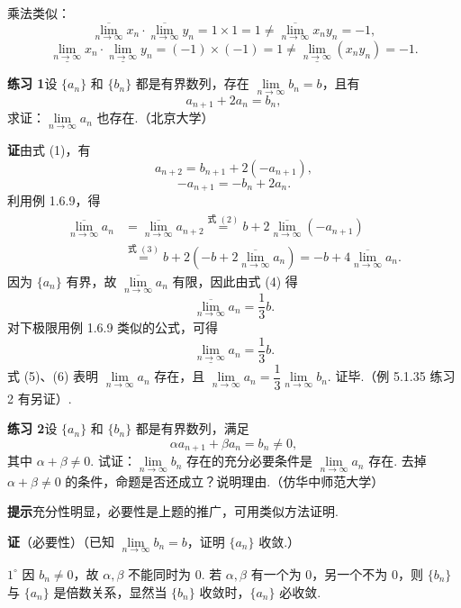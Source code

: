 \documentclass[UTF8, 12pt, fontset=fandol, oneside]{ctexart}
\begin{document}
乘法类似：
\[
  \overline{\lim_{n\to\infty}}x_n\cdot\overline{\lim_{n\to\infty}}y_n=1\times1=1
  \ne \overline{\lim_{n\to\infty}}x_ny_n=-1,
\]
\[
  \underline{\lim_{n\to\infty}}x_n\cdot\underline{\lim_{n\to\infty}}y_n=(-1)\times(-1)=1
  \ne \underline{\lim_{n\to\infty}}(x_ny_n)=-1.
\]

\noindent\textbf{练习 1}\quad 设 $\{a_n\}$ 和 $\{b_n\}$ 都是有界数列，存在 $\lim\limits_{n\to\infty}b_n=b$，且有
\[
  a_{n+1}+2a_n=b_n,
\tag{1}
\]
求证：$\lim\limits_{n\to\infty}a_n$ 也存在.（北京大学）

\noindent\textbf{证}\quad 由式 (1)，有
\[
  a_{n+2}=b_{n+1}+2(-a_{n+1}),
\tag{2}
\]
\[
  -a_{n+1}=-b_n+2a_n.
\tag{3}
\]
利用例 1.6.9，得
\[
\begin{aligned}
  \overline{\lim_{n\to\infty}}a_n
  &=\overline{\lim_{n\to\infty}}a_{n+2}
   \overset{\text{式 }(2)}{=} b+2\overline{\lim_{n\to\infty}}(-a_{n+1})\\
  &\overset{\text{式 }(3)}{=} b+2\left(-b+2\overline{\lim_{n\to\infty}}a_n\right)
   =-b+4\overline{\lim_{n\to\infty}}a_n.
\end{aligned}
\tag{4}
\]
因为 $\{a_n\}$ 有界，故 $\overline{\lim\limits_{n\to\infty}}a_n$ 有限，因此由式 (4) 得
\[
  \overline{\lim_{n\to\infty}}a_n=\frac13 b.
\tag{5}
\]
对下极限用例 1.6.9 类似的公式，可得
\[
  \underline{\lim_{n\to\infty}}a_n=\frac13 b.
\tag{6}
\]
式 (5)、(6) 表明 $\lim\limits_{n\to\infty}a_n$ 存在，且 $\lim\limits_{n\to\infty}a_n=\dfrac13\lim\limits_{n\to\infty}b_n$. 证毕.（例 5.1.35 练习 2 有另证）.

\noindent\textbf{练习 2}\quad 设 $\{a_n\}$ 和 $\{b_n\}$ 都是有界数列，满足
\[
  \alpha a_{n+1}+\beta a_n=b_n\ne0,
\tag{1}
\]
其中 $\alpha+\beta\ne0$. 试证：$\lim\limits_{n\to\infty}b_n$ 存在的充分必要条件是 $\lim\limits_{n\to\infty}a_n$ 存在. 去掉 $\alpha+\beta\ne0$ 的条件，命题是否还成立？说明理由.（仿华中师范大学）

\noindent\textbf{提示}\quad 充分性明显，必要性是上题的推广，可用类似方法证明.

\noindent\textbf{证}\quad （必要性）（已知 $\lim\limits_{n\to\infty}b_n=b$，证明 $\{a_n\}$ 收敛.）

$1^\circ$ 因 $b_n\ne0$，故 $\alpha,\beta$ 不能同时为 0. 若 $\alpha,\beta$ 有一个为 0，另一个不为 0，则 $\{b_n\}$ 与 $\{a_n\}$ 是倍数关系，显然当 $\{b_n\}$ 收敛时，$\{a_n\}$ 必收敛.
\end{document}
